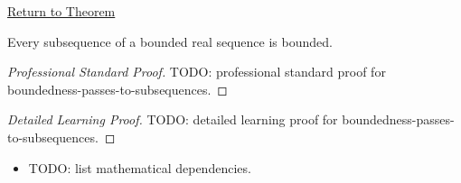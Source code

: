 \newpage
{}
\label{prf:boundedness-passes-to-subsequences}

\begin{remark*}[Return]
\hyperref[thm:boundedness-passes-to-subsequences]{Return to Theorem}
\end{remark*}

\begin{theorem*}
Every subsequence of a bounded real sequence is bounded.

\smallskip
\noindent
\end{theorem*}

\begin{proof}[Professional Standard Proof]
\LRAProofBodyStart
TODO: professional standard proof for boundedness-passes-to-subsequences.
\end{proof}

\begin{proof}[Detailed Learning Proof]
\LRAProofBodyStart
TODO: detailed learning proof for boundedness-passes-to-subsequences.
\end{proof}

\begin{remark*}
\end{remark*}

\begin{dependencies}
\begin{itemize}
  \item TODO: list mathematical dependencies.
\end{itemize}
\end{dependencies}

\clearpage
